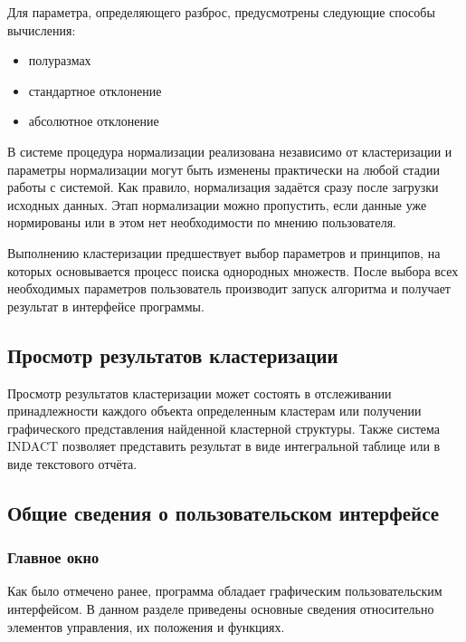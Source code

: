 \documentclass[12pt,tikz]{instruction}
\begin{document}
Для параметра, определяющего разброс, предусмотрены следующие способы вычисления:
\begin{itemize}
	\item полуразмах
	\item стандартное отклонение
	\item абсолютное отклонение
\end{itemize}
 
В системе \SysName процедура нормализации реализована независимо от кластеризации и параметры нормализации могут быть изменены практически на любой стадии работы с системой. Как правило, нормализация задаётся сразу после загрузки исходных данных. Этап нормализации можно пропустить, если данные уже нормированы или в этом нет необходимости по мнению пользователя.

Выполнению кластеризации предшествует выбор параметров и принципов, на которых основывается процесс поиска однородных множеств. После выбора всех необходимых параметров пользователь производит запуск алгоритма и получает результат в интерфейсе программы. 

\subsection{Просмотр результатов кластеризации}

Просмотр результатов кластеризации может состоять в отслеживании принадлежности каждого объекта определенным кластерам или получении графического представления найденной кластерной структуры. Также система INDACT позволяет представить результат в виде интегральной таблице или в виде текстового отчёта.


\subsection{Общие сведения о пользовательском интерфейсе}

\subsubsection{Главное окно}
\label{subsec:gui}
Как было отмечено ранее, программа обладает графическим пользовательским интерфейсом. В данном разделе приведены основные сведения относительно элементов управления, их положения и функциях.
\end{document}
